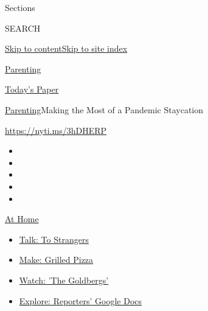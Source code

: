 Sections

SEARCH

\protect\hyperlink{site-content}{Skip to
content}\protect\hyperlink{site-index}{Skip to site index}

\href{https://www.nytimes3xbfgragh.onion/section/parenting}{Parenting}

\href{https://myaccount.nytimes3xbfgragh.onion/auth/login?response_type=cookie\&client_id=vi}{}

\href{https://www.nytimes3xbfgragh.onion/section/todayspaper}{Today's
Paper}

\href{/section/parenting}{Parenting}\textbar{}Making the Most of a
Pandemic Staycation

\url{https://nyti.ms/3hDHERP}

\begin{itemize}
\item
\item
\item
\item
\item
\end{itemize}

\href{https://www.nytimes3xbfgragh.onion/spotlight/at-home?action=click\&pgtype=Article\&state=default\&region=TOP_BANNER\&context=at_home_menu}{At
Home}

\begin{itemize}
\tightlist
\item
  \href{https://www.nytimes3xbfgragh.onion/2020/08/03/well/family/the-benefits-of-talking-to-strangers.html?action=click\&pgtype=Article\&state=default\&region=TOP_BANNER\&context=at_home_menu}{Talk:
  To Strangers}
\item
  \href{https://www.nytimes3xbfgragh.onion/2020/08/01/at-home/coronavirus-make-pizza-on-a-grill.html?action=click\&pgtype=Article\&state=default\&region=TOP_BANNER\&context=at_home_menu}{Make:
  Grilled Pizza}
\item
  \href{https://www.nytimes3xbfgragh.onion/2020/07/31/arts/television/goldbergs-abc-stream.html?action=click\&pgtype=Article\&state=default\&region=TOP_BANNER\&context=at_home_menu}{Watch:
  'The Goldbergs'}
\item
  \href{https://www.nytimes3xbfgragh.onion/interactive/2020/at-home/even-more-reporters-editors-diaries-lists-recommendations.html?action=click\&pgtype=Article\&state=default\&region=TOP_BANNER\&context=at_home_menu}{Explore:
  Reporters' Google Docs}
\end{itemize}

